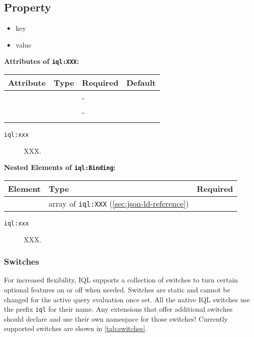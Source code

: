 \documentclass[11pt]{article}
\newcommand{\iqlns}{iql:}
\newcommand{\iqlType}[1]{\texttt{\iqlns#1}}
\newcommand{\attributes}[1]{\noindent\textbf{Attributes of \iqlType{#1}:}\newline\medskip}
\newcommand{\elements}[1]{\noindent\textbf{Nested Elements of \iqlType{#1}:}\newline\medskip}
\begin{document}
\subsection{Property}
\label{sec:json-ld-property}
\begin{itemize}
	\item key
	\item value
\end{itemize}
\attributes{XXX}
\begin{tabular}{|p{}|p{}|p{}|p{}|}
	\hline
	\textbf{Attribute} & \textbf{Type} & \textbf{Required} & \textbf{Default} \\ 
	\hline
	\hline
	&  & - &  \\ 
	\hline 
	&  & - &  \\ 
	\hline 
	&  &  & \\ 
	\hline 
\end{tabular}
\begin{description}
	\item[\iqlType{xxx}] XXX.
\end{description}
\elements{Binding}
\begin{tabular}{|p{}|p{}|p{}|}
	\hline
	\textbf{Element} & \textbf{Type} & \textbf{Required} \\ 
	\hline
	\hline 
	& array of \iqlType{XXX} (\ref{sec:json-ld-reference}) &  \\ 
	\hline 
\end{tabular}
\begin{description}
	\item[\iqlType{xxx}] XXX.
\end{description}

\subsubsection{Switches}
\label{sec:json-ld-switches}
For increased flexibility, IQL supports a collection of switches to turn certain optional features on or off when needed. Switches are static and cannot be changed for the active query evaluation once set. All the native IQL switches use the prefix \texttt{iql} for their name. Any extensions that offer additional switches should declare and use their own namespace for those switches! Currently supported switches are shown in \cref{tab:switches}. %
\end{document}
